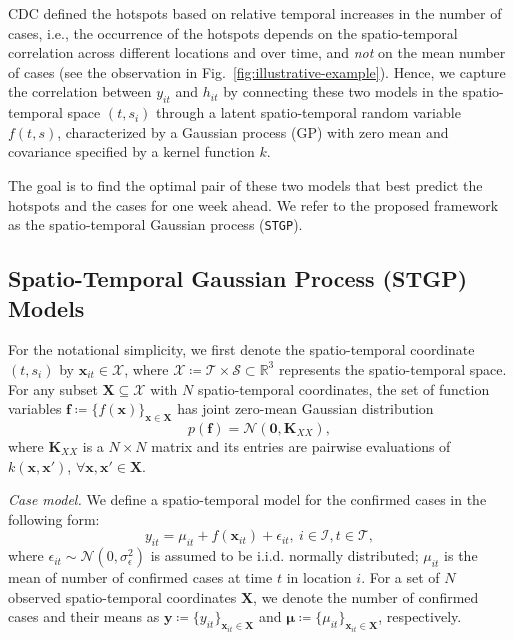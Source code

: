 \documentclass[journal]{IEEEtran}
\begin{document}
CDC \cite{oster2020trends} defined the hotspots based on relative temporal increases in the number of cases, i.e., the occurrence of the hotspots depends on the spatio-temporal correlation across different locations and over time, and {\it not} on the mean number of cases (see the observation in Fig.~\ref{fig:illustrative-example}).
Hence, we capture the correlation between $y_{it} $ and  $h_{it}$ by connecting these two models in the spatio-temporal space $(t, s_i)$ through a latent spatio-temporal random variable $f(t, s)$, characterized by a Gaussian process (GP) with zero mean and covariance specified by a kernel function $k$.

The goal is to find the optimal pair of these two models that best predict the hotspots and the cases for one week ahead. We refer to the proposed framework as the spatio-temporal Gaussian process (\texttt{STGP}).


\subsection{Spatio-Temporal Gaussian Process (STGP) Models}
\label{sec:spatio-temporal-gaussian}

For the notational simplicity, we first
denote the spatio-temporal coordinate $(t, s_i)$ by $\mathbf x_{it} \in \mathscr{X}$, where $\mathscr{X} \coloneqq \mathscr{T} \times \mathscr{S} \subset \mathbb{R}^3$ represents the spatio-temporal space.
For any subset $\mathbf{X} \subseteq \mathscr{X}$ with $N$ spatio-temporal coordinates, the set of function variables $\mathbf{f} \coloneqq \{f(\mathbf{x})\}_{\mathbf{x}\in\mathbf{X}}$ has joint zero-mean Gaussian distribution
\begin{equation}
    p(\mathbf{f}) = \mathcal{N}(\mathbf{0}, \mathbf{K}_{XX}),
    \label{eq:prior}
\end{equation}
where $\mathbf{K}_{XX}$ is a $N \times N$ matrix and its entries are pairwise evaluations of $k(\mathbf{x}, \mathbf{x}')$, $\forall \mathbf{x}, \mathbf{x}' \in \mathbf{X}$.

\vspace{.1in}
\noindent\emph{Case model.}
We define a spatio-temporal model for the confirmed cases 
in the following form:
\begin{equation}
    y_{it} = \mu_{it} + f(\mathbf x_{it}) + \epsilon_{it},~i\in\mathscr{I},t\in\mathscr{T},
    \label{eq:y-conditional-f}
\end{equation}
where $\epsilon_{it} \sim \mathcal{N}(0, \sigma_\epsilon^2)$ is assumed to be i.i.d. normally distributed; $\mu_{it}$ is the mean of number of confirmed cases at time $t$ in location $i$. 
For a set of $N$ observed spatio-temporal coordinates $\mathbf{X}$, we denote the number of confirmed cases and their means as $\mathbf{y} \coloneqq \{y_{it}\}_{\mathbf{x}_{it}\in\mathbf{X}}$ and $\boldsymbol{\mu} \coloneqq \{\mu_{it}\}_{\mathbf{x}_{it}\in\mathbf{X}}$, respectively.
\end{document}
